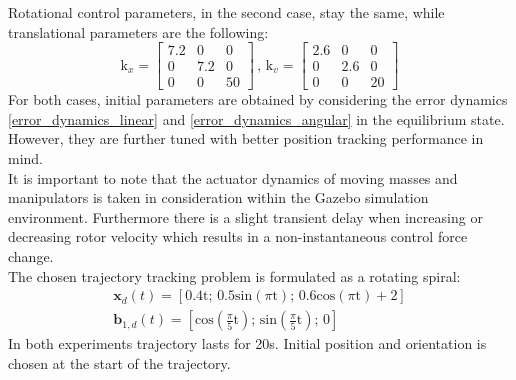 \noindent Rotational control parameters, in the second case, stay the same, while translational parameters are the following: 
\begin{equation*}
	\text{k}_x = 
	\begin{bmatrix}
		7.2 &  0  &  0 \\
		0 & 7.2  &	0 \\ 
		0 &  0  & 50 	
	\end{bmatrix}
	\, , \,	
	\text{k}_v =
	\begin{bmatrix}
		2.6 & 0 & 0 \\
		0 & 2.6 & 0 \\
		0 & 0 & 20
	\end{bmatrix}
\end{equation*}
For both cases, initial parameters are obtained by considering the error dynamics \eqref{error_dynamics_linear} and \eqref{error_dynamics_angular} in the equilibrium state. However, they are further tuned with better position tracking performance in mind.\\
It is important to note that the actuator dynamics of moving masses and manipulators is taken in consideration within the Gazebo simulation environment. Furthermore there is a slight transient delay when increasing or decreasing rotor velocity which results in a non-instantaneous control force change. \\
\indent The chosen trajectory tracking problem is formulated as a rotating spiral:
\begin{gather*}
	\textbf{x}_d(t) = [0.4\text{t}; \, 0.5\text{sin}(\pi\text{t}); \, 0.6\text{cos}(\pi\text{t}) + 2] \\
	\textbf{b}_{1,d}(t) = [\text{cos}\left(\frac{\pi}{5}\text{t}\right); \, \text{sin}\left(\frac{\pi}{5}\text{t}\right); \, 0]
\end{gather*}
\noindent In both experiments trajectory lasts for 20s. Initial position and orientation is chosen at the start of the trajectory. \\

